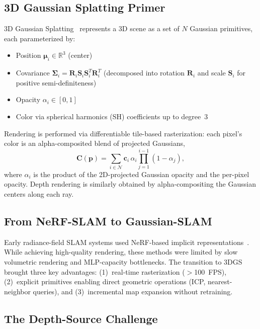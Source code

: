 \subsection{3D Gaussian Splatting Primer}

3D Gaussian Splatting~\cite{kerbl2023_3dgs} represents a 3D scene as a set
of $N$ Gaussian primitives, each parameterized by:
\begin{itemize}
    \item Position $\boldsymbol{\mu}_i \in \mathbb{R}^3$ (center)
    \item Covariance $\boldsymbol{\Sigma}_i = \boldsymbol{R}_i
    \boldsymbol{S}_i \boldsymbol{S}_i^T \boldsymbol{R}_i^T$ (decomposed into
    rotation $\boldsymbol{R}_i$ and scale $\boldsymbol{S}_i$ for positive
    semi-definiteness)
    \item Opacity $\alpha_i \in [0,1]$
    \item Color via spherical harmonics (SH) coefficients up to degree~3
\end{itemize}
Rendering is performed via differentiable tile-based rasterization: each
pixel's color is an alpha-composited blend of projected Gaussians,
\begin{equation}
    \boldsymbol{C}(\boldsymbol{p}) = \sum_{i \in \mathcal{N}}
    \boldsymbol{c}_i \, \alpha_i \prod_{j=1}^{i-1}(1-\alpha_j),
\end{equation}
where $\alpha_i$ is the product of the 2D-projected Gaussian opacity and
the per-pixel opacity.  Depth rendering is similarly obtained by
alpha-compositing the Gaussian centers along each ray.

\subsection{From NeRF-SLAM to Gaussian-SLAM}

Early radiance-field SLAM systems used NeRF-based implicit
representations~\cite{sucar2021_imap,zhu2022_niceslam,wang2023_coslam,
rosinol2023_nerfslam,sandstrom2023_pointslam}.  While achieving high-quality
rendering, these methods were limited by slow volumetric rendering and
MLP-capacity bottlenecks.  The transition to 3DGS brought three key
advantages: (1)~real-time rasterization ($>$100~FPS), (2)~explicit
primitives enabling direct geometric operations (ICP, nearest-neighbor
queries), and (3)~incremental map expansion without retraining.

\subsection{The Depth-Source Challenge}

